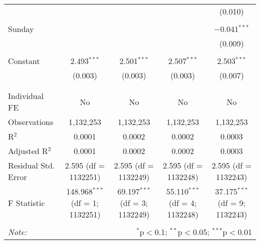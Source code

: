 \documentclass[
]{article}
\begin{document}
\begin{table}[!htbp]
{\begin{tabular}{@{\extracolsep{5pt}}lcccc}
  &  &  &  & (0.010) \\ 
  & & & & \\ 
 Sunday &  &  &  & $-$0.041$^{***}$ \\ 
  &  &  &  & (0.009) \\ 
  & & & & \\ 
 Constant & 2.493$^{***}$ & 2.501$^{***}$ & 2.507$^{***}$ & 2.503$^{***}$ \\ 
  & (0.003) & (0.003) & (0.003) & (0.007) \\ 
  & & & & \\ 
\hline \\[-1.8ex] 
Individual FE & No & No & No & No \\ 
Observations & 1,132,253 & 1,132,253 & 1,132,253 & 1,132,253 \\ 
R$^{2}$ & 0.0001 & 0.0002 & 0.0002 & 0.0003 \\ 
Adjusted R$^{2}$ & 0.0001 & 0.0002 & 0.0002 & 0.0003 \\ 
Residual Std. Error & 2.595 (df = 1132251) & 2.595 (df = 1132249) & 2.595 (df = 1132248) & 2.595 (df = 1132243) \\ 
F Statistic & 148.968$^{***}$ (df = 1; 1132251) & 69.197$^{***}$ (df = 3; 1132249) & 55.110$^{***}$ (df = 4; 1132248) & 37.175$^{***}$ (df = 9; 1132243) \\ 
\hline 
\hline \\[-1.8ex] 
\textit{Note:}  & \multicolumn{4}{r}{$^{*}$p$<$0.1; $^{**}$p$<$0.05; $^{***}$p$<$0.01} \\ 
\end{tabular}
} 
\end{table} 
\newpage
\end{document}
